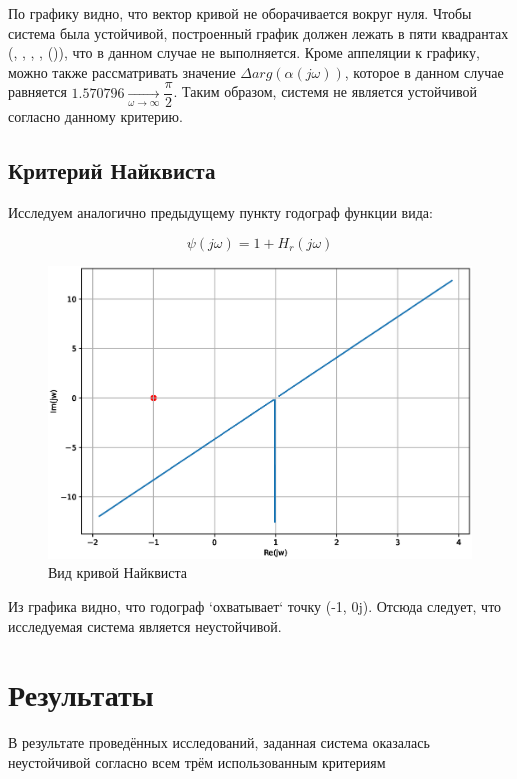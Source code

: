 \documentclass[12pt]{article}
\newcommand{\RomanNum}[1]
    {\MakeUppercase{\romannumeral #1}}
\begin{document}
\pagebreak

По графику видно, что вектор кривой не оборачивается вокруг нуля. Чтобы система была устойчивой, построенный график должен лежать в пяти квадрантах (\RomanNum{1}, \RomanNum{2}, \RomanNum{3}, \RomanNum{4}, \RomanNum{1}(\RomanNum{5})), что в данном случае не выполняется. Кроме аппеляции к графику, можно также рассматривать значение $\Delta arg(\alpha(j\omega))$, которое в данном случае равняется $1.570796 \xrightarrow[\omega \rightarrow \infty]{} \dfrac{\pi}{2} $. Таким образом, системя не является устойчивой согласно данному критерию.

\subsection{Критерий Найквиста}

Исследуем аналогично предыдущему пункту годограф функции вида:

\begin{equation}
 \psi(j \omega) = 1 + H_{r}(j \omega) 
\end{equation}

\begin{figure}[H]
\centerline{\includegraphics[scale = 0.6]{Figure_2.eps}}
\caption{Вид кривой Найквиста}
\end{figure}

Из графика видно, что годограф `охватывает` точку (-1, 0j). Отсюда следует, что исследуемая система является неустойчивой.

\section{Результаты}

В результате проведённых исследований, заданная система оказалась неустойчивой согласно всем трём использованным критериям
\end{document}

